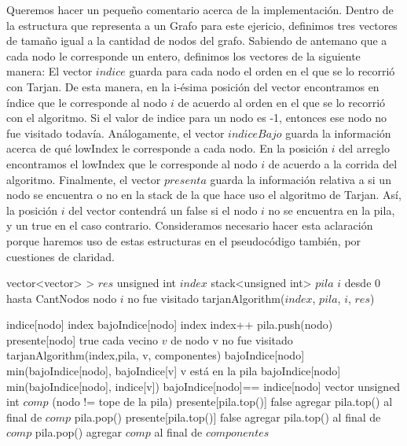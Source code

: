 \quad Queremos hacer un pequeño comentario acerca de la implementación. Dentro de la estructura que representa a un Grafo para este ejericio, definimos tres vectores de tamaño igual a la cantidad de nodos del grafo. Sabiendo de antemano que a cada nodo le corresponde un entero, definimos los vectores de la siguiente manera:
\quad El vector $indice$ guarda para cada nodo el orden en el que se lo recorrió con Tarjan. De esta manera, en la i-ésima posición del vector encontramos en índice que le corresponde al nodo $i$ de acuerdo al orden en el que se lo recorrió con el algoritmo. Si el valor de indice para un nodo es -1, entonces ese nodo no fue visitado todavía.
\quad Análogamente, el vector $indiceBajo$ guarda la información acerca de qué lowIndex le corresponde a cada nodo. En la posición $i$ del arreglo encontramos el lowIndex que le corresponde al nodo $i$ de acuerdo a la corrida del algoritmo.
\quad Finalmente, el vector $presenta$ guarda la información relativa a si un nodo se encuentra o no en la stack de la que hace uso el algoritmo de Tarjan. Así, la posición $i$ del vector contendrá un false si el nodo $i$ no se encuentra en la pila, y un true en el caso contrario.
\quad Consideramos necesario hacer esta aclaración porque haremos uso de estas estructuras en el pseudocódigo también, por cuestiones de claridad.




\begin{algorithm}[H]
\caption{} 
\begin{codebox}
\li vector<vector> > $res$
\li unsigned int $index$
\li stack<unsigned int> $pila$
\li
\li \For $i$ desde 0 hasta CantNodos \Do
\li	\If nodo $i$ no fue visitado \Do
\li	tarjanAlgorithm($index$, $pila$, $i$, $res$)
	\End	
    \End
\End
\end{codebox}
\end{algorithm}


\begin{algorithm}[H]
\caption{} 
\begin{codebox}
\li indice[nodo] \gets index
\li bajoIndice[nodo] \gets index
\li index++
\li pila.push(nodo)
\li presente[nodo] \gets true
\li 	 
\li \For cada vecino $v$ de nodo \Do
\li 	\If v no fue visitado \Do
\li		tarjanAlgorithm(index,pila, v, componentes)
\li		bajoIndice[nodo] \gets min(bajoIndice[nodo], bajoIndice[v]
\li	\Else 
\li		\If v está en la pila \Do
\li			bajoIndice[nodo] \gets min(bajoIndice[nodo], indice[v])
		\End
	\End
    \End
\li
\li \If bajoIndice[nodo]== indice[nodo] \Do
\li	vector unsigned int $comp$
\li 	\While (nodo != tope de la pila) \Do
\li		presente[pila.top()] \gets false
\li		agregar pila.top() al final de $comp$
\li		pila.pop()
	\End
\li	presente[pila.top()] \gets false
\li	agregar pila.top() al final de $comp$
\li	pila.pop()
\li 	agregar $comp$ al final de $componentes$		
\li \End
\End
\end{codebox}
\end{algorithm}


